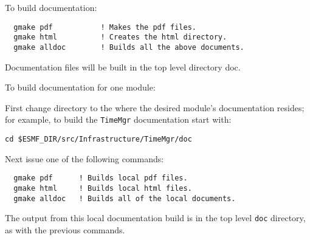 \noindent To build documentation:
\begin{verbatim}
  gmake pdf           ! Makes the pdf files.
  gmake html          ! Creates the html directory.
  gmake alldoc        ! Builds all the above documents.
\end{verbatim}

\noindent Documentation files will be built in the top level directory doc.

\noindent To build documentation for one module:

\noindent First change directory to the where the desired module's documentation 
resides; for example, to build the {\tt TimeMgr} documentation start
with:

\begin{verbatim}
cd $ESMF_DIR/src/Infrastructure/TimeMgr/doc
\end{verbatim}

\noindent Next issue one of the following commands:
\begin{verbatim}
  gmake pdf      ! Builds local pdf files.
  gmake html     ! Builds local html files.
  gmake alldoc   ! Builds all of the local documents.
\end{verbatim}

\noindent The output from this local documentation build is in the top 
level {\tt doc} directory, as with the previous commands.







